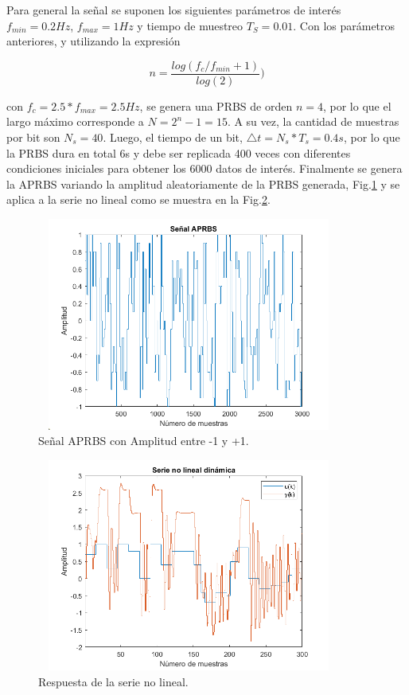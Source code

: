 \documentclass[12pt]{article}
\begin{document}
Para general la señal se suponen los siguientes parámetros de interés $f_{min}=0.2 Hz$, $f_{max}=1 Hz$ y tiempo de muestreo $T_S=0.01$. Con los parámetros anteriores, y utilizando la expresión

\begin{equation}
n=\frac{log(f_c/f_{min}+1)}{log(2)})
\label{e_}
\end{equation}

con $f_c=2.5*f_{max}=2.5 Hz$, se genera una PRBS de orden $n= 4$, por lo que el largo máximo corresponde a $N = 2^n - 1 = 15$. A su vez, la cantidad de muestras por bit son $N_{s} = 40$. Luego, el tiempo de un bit, $\triangle t=N_s*T_s=0.4s$, por lo que la PRBS dura en total 6s y debe ser replicada 400 veces con diferentes condiciones iniciales para obtener los 6000 datos de interés. Finalmente se genera la APRBS variando la amplitud aleatoriamente de la PRBS generada, Fig.\ref{f_APRBS} y se aplica a la serie no lineal como se muestra en la Fig.\ref{f_SerieNoLineal}.

\begin{figure}
\centering
\includegraphics[width=10cm,height=7cm]{imag/APRBS}
\caption{Señal APRBS con Amplitud entre -1 y +1.}
\label{f_APRBS}
\end{figure}

\begin{figure}
\centering
\includegraphics[width=10cm,height=7cm]{imag/SerieNoLineal}
\caption{Respuesta de la serie no lineal.}
\label{f_SerieNoLineal}
\end{figure}
\end{document}
